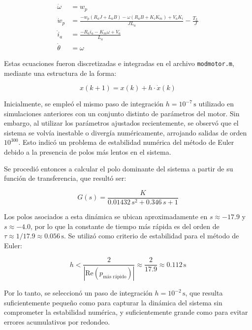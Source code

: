 \documentclass{article}
\begin{document}
\begin{align*}
    \dot{\omega} &= w_p \\
    \dot{w}_p &= \frac{-w_p(R_a J + L_a B) - \omega(R_a B + K_i K_m) + V_a K_i}{J L_a} - \frac{T_L}{J} \\
    \dot{i}_a &= \frac{-R_a i_a - K_m \omega + V_a}{L_a} \\
    \dot{\theta} &= \omega
\end{align*}

\noindent Estas ecuaciones fueron discretizadas e integradas en el archivo \texttt{modmotor.m}, mediante una estructura de la forma:

\begin{equation*}
    x(k+1) = x(k) + h \cdot \dot{x}(k)
\end{equation*}

Inicialmente, se empleó el mismo paso de integración \(h = 10^{-7}\,\text{s}\) utilizado en simulaciones anteriores con un conjunto distinto de parámetros del motor. Sin embargo, al utilizar los parámetros ajustados recientemente, se observó que el sistema se volvía inestable o divergía numéricamente, arrojando salidas de orden \(10^{300}\). Esto indicó un problema de estabilidad numérica del método de Euler debido a la presencia de polos más lentos en el sistema.

Se procedió entonces a calcular el polo dominante del sistema a partir de su función de transferencia, que resultó ser:

\begin{equation*}
    G(s) = \frac{K}{0.01432\,s^2 + 0.346\,s + 1}
\end{equation*}

Los polos asociados a esta dinámica se ubican aproximadamente en \(s \approx -17.9\) y \(s \approx -4.0\), por lo que la constante de tiempo más rápida es del orden de \(\tau \approx 1/17.9 \approx 0.056\,\text{s}\). Se utilizó como criterio de estabilidad para el método de Euler:

\begin{equation*}
    h < \frac{2}{|\text{Re}(p_{\text{más rápido}})|} \approx \frac{2}{17.9} \approx 0.112\,\text{s}
\end{equation*}

Por lo tanto, se seleccionó un paso de integración \(h = 10^{-2}\,\text{s}\), que resulta suficientemente pequeño como para capturar la dinámica del sistema sin comprometer la estabilidad numérica, y suficientemente grande como para evitar errores acumulativos por redondeo.
\end{document}
